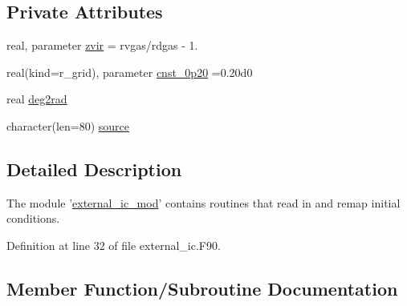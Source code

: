 \subsection*{Private Attributes}
\begin{DoxyCompactItemize}
\item 
real, parameter \hyperlink{classexternal__ic__mod_ae145645946e5e06d6f5af880aaff9b1e}{zvir} = rvgas/rdgas -\/ 1.
\item 
real(kind=r\-\_\-grid), parameter \hyperlink{classexternal__ic__mod_a5405c33818b4654e81d65a4d167bf30d}{cnst\-\_\-0p20} =0.\-20d0
\item 
real \hyperlink{classexternal__ic__mod_afabc509912a4ec0c963a4b262a69fae8}{deg2rad}
\item 
character(len=80) \hyperlink{classexternal__ic__mod_a74aa0c5ee3e124f0d7a6a4688b045c6e}{source}
\end{DoxyCompactItemize}


\subsection{Detailed Description}
The module '\hyperlink{classexternal__ic__mod}{external\-\_\-ic\-\_\-mod}' contains routines that read in and remap initial conditions. 

Definition at line 32 of file external\-\_\-ic.\-F90.



\subsection{Member Function/\-Subroutine Documentation}
